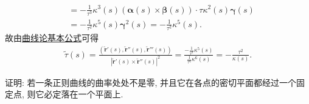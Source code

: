 \documentclass[../../main.tex]{subfiles}%
\begin{document}
\begin{solution}
\begin{align*}
&= -\frac{1}{\tau^3}\kappa^3(s)\left(\bm{\alpha}(s) \times \bm{\beta}(s)\right) \cdot \tau\kappa^2(s)\bm{\gamma}(s)\\
&= -\frac{1}{\tau^2}\kappa^5(s)\bm{\gamma}^2(s) = -\frac{1}{\tau^2}\kappa^5(s).
\end{align*}
故由\hyperref[theorem:曲线论基本公式]{曲线论基本公式}可得
\begin{align*}
\widetilde{\tau}(s) = \frac{\left(\widetilde{\bm{r}}'(s), \widetilde{\bm{r}}''(s), \widetilde{\bm{r}}'''(s)\right)}{|\widetilde{\bm{r}}'(s) \times \widetilde{\bm{r}}''(s)|^2} = \frac{-\frac{1}{\tau^2}\kappa^5(s)}{\frac{1}{\tau^4}\kappa^6(s)} = -\frac{\tau^2}{\kappa(s)}.
\end{align*}

\end{solution}

\begin{example}
证明: 若一条正则曲线的曲率处处不是零, 并且它在各点的密切平面都经过一个固定点, 则它必定落在一个平面上.
\end{example}
\end{document}
